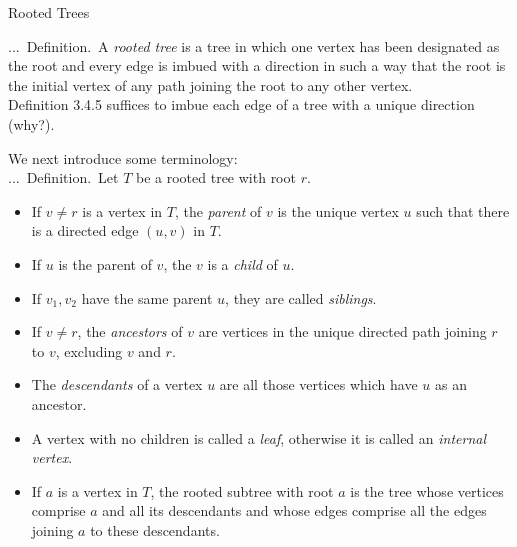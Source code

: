 \documentclass[smaller,hyperref={CJKbookmarks=true}]{beamer}
\newcounter{zhuo}[subsection]
\renewcommand{\thezhuo}{\thesection.\thesubsection.\arabic{zhuo}}
\newenvironment{DEFINITION}{\stepcounter{zhuo}\alert{\thezhuo.~Definition.\,}}{}
\begin{document}
\begin{frame}{Rooted Trees}
\begin{spacing}{1.15}
\vspace*{12pt}
\begin{DEFINITION}
A \emph{rooted tree} is a tree in which one vertex has been
designated as the root and every edge is imbued with a direction in such a
way that the root is the initial vertex of any path joining the root to any
other vertex.\\[7pt]
Definition 3.4.5 suffices to imbue each edge of a tree with a unique direction (why?).
\end{DEFINITION}
\end{spacing}
\newpage
\begin{spacing}{1}
We next introduce some terminology:\\
\begin{DEFINITION}
Let $T$ be a rooted tree with root $r$.
\begin{itemize}
  \item If $v\neq r$ is a vertex in $T$, the \emph{parent} of $v$ is the unique vertex $u$ such that there is a directed edge $(u,v)$ in $T$.
  \item If $u$ is the parent of $v$, the $v$ is a \emph{child} of $u$.
  \item If $v_1,v_2$ have the same parent $u$, they are called \emph{siblings}.
  \item If $v\neq r$, the \emph{ancestors} of $v$ are vertices in the unique directed path joining $r$ to $v$, excluding $v$ and $r$.
  \item The \emph{descendants} of a vertex $u$ are all those vertices which have $u$ as an ancestor.
  \item A vertex with no children is called a \emph{leaf}, otherwise it is called an \emph{internal vertex}.
  \item If $a$ is a vertex in $T$, the rooted subtree with root $a$ is the tree whose vertices comprise $a$ and all its descendants and whose edges comprise all the edges joining $a$ to these descendants.
\end{itemize}
\end{DEFINITION}
\end{spacing}
\end{frame}
\end{document}
